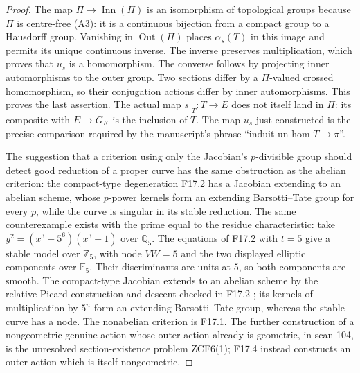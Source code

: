 \begin{proof}
The map $\Pi\to\operatorname{Inn}(\Pi)$ is an isomorphism of
topological groups because $\Pi$ is centre-free (A3): it is a
continuous bijection from a compact group to a Hausdorff group.
Vanishing in $\operatorname{Out}(\Pi)$ places $\alpha_s(T)$
in this image and permits its unique continuous inverse. The
inverse preserves multiplication, which proves that $u_s$ is a
homomorphism. The converse follows by projecting inner
automorphisms to the outer group. Two sections differ by a
$\Pi$-valued crossed homomorphism, so their conjugation actions
differ by inner automorphisms. This proves the last assertion.
The actual map $s|_T:T\to E$ does not itself land in $\Pi$:
its composite with $E\to G_K$ is the inclusion of $T$.
The map $u_s$ just constructed is the precise comparison required
by the manuscript's phrase ``induit un hom $T\to\pi$''.

The suggestion that a criterion using only the Jacobian's
$p$-divisible group should detect good reduction of a proper
curve has the same obstruction as the abelian criterion:
the compact-type degeneration F17.2 has a Jacobian extending
to an abelian scheme, whose $p$-power kernels form an extending
Barsotti--Tate group for every $p$, while the curve is singular
in its stable reduction. The same counterexample exists with the
prime equal to the residue characteristic: take
$y^2=(x^3-5^6)(x^3-1)$ over $\mathbb Q_5$. The equations of F17.2
with $t=5$ give a stable model over $\mathbb Z_5$, with node
$VW=5$ and the two displayed elliptic components over $\mathbb F_5$.
Their discriminants are units at $5$, so both components are
smooth. The compact-type Jacobian extends to an abelian scheme
by the relative-Picard construction and descent checked in F17.2
\cite[\S1]{CF_DupuyRabinoff2017};
its kernels of multiplication by $5^n$ form an extending
Barsotti--Tate group, whereas the stable curve has a node.
The nonabelian criterion is F17.1.
The further construction of a nongeometric genuine action whose
outer action already is geometric, in scan 104, is the unresolved
section-existence problem ZCF6(1); F17.4 instead constructs an
outer action which is itself nongeometric.
\end{proof}

